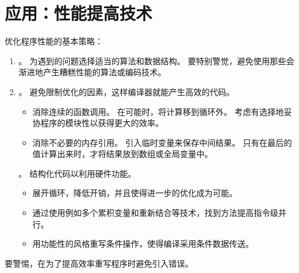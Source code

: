 
\section{应用：性能提高技术}
{
    优化程序性能的基本策略：

    \begin{enumerate}
        \item
        {
            。
            为遇到的问题选择适当的算法和数据结构。
            要特别警觉，避免使用那些会渐进地产生糟糕性能的算法或编码技术。
        }
        \item
        {
            。
            避免限制优化的因素，这样编译器就能产生高效的代码。

            \begin{itemize}
                \item
                {
                    消除连续的函数调用。
                    在可能时，将计算移到循环外。
                    考虑有选择地妥协程序的模块性以获得更大的效率。
                }
                \item
                {
                    消除不必要的内存引用。
                    引入临时变量来保存中间结果。
                    只有在最后的值计算出来时，才将结果放到数组或全局变量中。
                }
            \end{itemize}
        }
        {
            。
            结构化代码以利用硬件功能。

            \begin{itemize}
                \item 展开循环，降低开销，并且使得进一步的优化成为可能。
                \item 通过使用例如多个累积变量和重新结合等技术，找到方法提高指令级并行。
                \item 用功能性的风格重写条件操作，使得编译采用条件数据传送。
            \end{itemize}
        }
    \end{enumerate}

    要警惕，在为了提高效率重写程序时避免引入错误。
}
